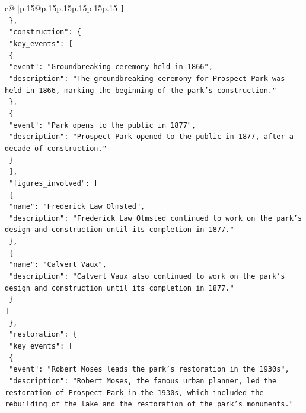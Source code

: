 \documentclass{article}
\begin{document}
{\begin{supertabular}{c@{$\;$}|p{.15\linewidth}@{}p{.15\linewidth}p{.15\linewidth}p{.15\linewidth}p{.15\linewidth}p{.15\linewidth}}
{{{\texttt{      {]}} \\
\texttt{    \},} \\
\texttt{    "construction": \{} \\
\texttt{      "key\_events": {[}} \\
\texttt{        \{} \\
\texttt{          "event": "Groundbreaking ceremony held in 1866",} \\
\texttt{          "description": "The groundbreaking ceremony for Prospect Park was held in 1866, marking the beginning of the park's construction."} \\
\texttt{        \},} \\
\texttt{        \{} \\
\texttt{          "event": "Park opens to the public in 1877",} \\
\texttt{          "description": "Prospect Park opened to the public in 1877, after a decade of construction."} \\
\texttt{        \}} \\
\texttt{      {]},} \\
\texttt{      "figures\_involved": {[}} \\
\texttt{        \{} \\
\texttt{          "name": "Frederick Law Olmsted",} \\
\texttt{          "description": "Frederick Law Olmsted continued to work on the park's design and construction until its completion in 1877."} \\
\texttt{        \},} \\
\texttt{        \{} \\
\texttt{          "name": "Calvert Vaux",} \\
\texttt{          "description": "Calvert Vaux also continued to work on the park's design and construction until its completion in 1877."} \\
\texttt{        \}} \\
\texttt{      {]}} \\
\texttt{    \},} \\
\texttt{    "restoration": \{} \\
\texttt{      "key\_events": {[}} \\
\texttt{        \{} \\
\texttt{          "event": "Robert Moses leads the park's restoration in the 1930s",} \\
\texttt{          "description": "Robert Moses, the famous urban planner, led the restoration of Prospect Park in the 1930s, which included the rebuilding of the lake and the restoration of the park's monuments."} \\
}}}
\end{supertabular}}
\end{document}
